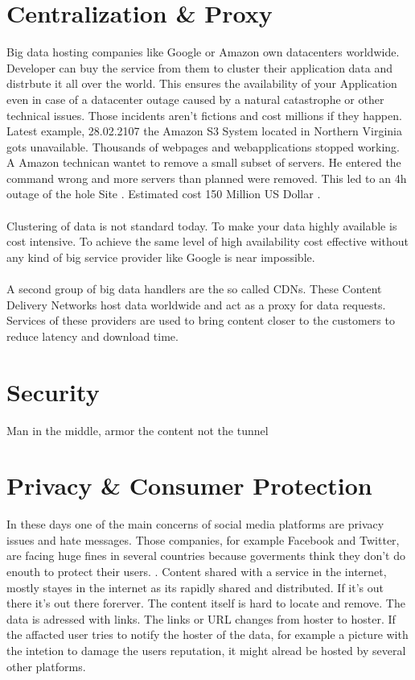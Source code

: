 \documentclass[a4paper,11pt, oneside]{report}
\theoremstyle{definition}
\begin{document}
\section{Centralization \& Proxy}
Big data hosting companies like Google or Amazon own datacenters worldwide. Developer can buy the service from them to cluster their application data  and distrbute it all over the world. This ensures the availability of your Application even in case of a datacenter outage caused by a natural catastrophe or other technical issues. Those incidents aren't fictions and cost millions if they happen. Latest example, 28.02.2107 the Amazon S3 System located in Northern Virginia gots unavailable. Thousands of webpages and webapplications stopped working. A Amazon technican wantet to remove a small subset of servers. He entered the command wrong and more servers than planned were removed. This led to an 4h outage of the hole Site \cite{AWSOutage}. Estimated cost 150 Million US Dollar \cite{AWSOutageCost}.\\\\
Clustering of data is not standard today. To make your data highly available is cost intensive. To achieve the same level of high availability cost effective without any kind of big service provider like Google is near impossible.\\\\
A second group of big data handlers are the so called CDNs. These Content Delivery Networks host data worldwide and act as a proxy for data requests. Services of these providers are used to bring content closer to the customers to reduce latency and download time.

\section{Security}
Man in the middle, armor the content not the tunnel

\section{Privacy \& Consumer Protection}
In these days one of the main concerns of social media platforms are privacy issues and hate messages. Those companies, for example Facebook and Twitter, are facing huge fines in several countries because goverments think they don't do enouth to protect their users. \cite{HateSpeech}. Content shared with a service in the internet, mostly stayes in the internet as its rapidly shared and distributed. If it's out there it's out there forerver. The content itself is hard to locate and remove. The data is adressed with links. The links or URL changes from hoster to hoster. If the affacted user tries to notify the hoster of the data, for example a picture with the intetion to damage the users reputation, it might alread be hosted by several other platforms.
\end{document}
